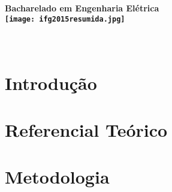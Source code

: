 \documentclass[
	12pt,				%
	openright,			%
	oneside,
	a4paper,
	english,			%
	french,				%
	spanish,			%
	brazil,				%
	]{abntex2}
\begin{document}
\begin{titlingpage}
    \centering
    \vfill
    {\bfseries\Large
        Bacharelado em Engenharia Elétrica\\
        \texttt{[image: ifg2015resumida.jpg]}
        \vskip2cm
        \imprimirautor\\
        \vspace{2.5cm}
        \huge 
       \imprimirtitulo\\[1cm]
    }
    \vfill
    \vfill
    \vfill
    \Large
    \imprimirlocal\\
    \imprimirdata
\end{titlingpage}


\frenchspacing 

\imprimirfolhaderosto

\tableofcontents*
\cleardoublepage

\textual

\chapter[Introdução]{Introdução}\label{cap:introducao}



\chapter[Referencial Teórico]{Referencial Teórico}\label{cap:referencial}


\chapter[Metodologia]{Metodologia}\label{cap:metodologia}





\postextual



\end{document}
